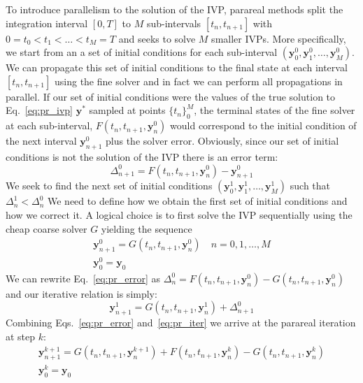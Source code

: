 \documentclass[11pt]{report}
\begin{document}
    To introduce parallelism to the solution of the IVP, parareal methods split the integration interval $[0, T]$ to $M$
    sub-intervals $[t_n, t_{n+1}]$ with $0 = t_0 < t_1 < \dots < t_M = T$ and seeks to solve $M$ smaller IVPs.
    More specifically, we start from an a set of initial conditions for each sub-interval
    $(\pmb{y}_0^{0}, \pmb{y}_1^{0}, \dots ,\pmb{y}_M^{0})$.
    We can propagate this set of initial conditions to the final state at each interval $[t_n, t_{n+1}]$ using the fine
    solver and in fact we can perform all propagations in parallel.
    If our set of initial conditions were the values of the true solution to Eq.~\ref{eq:pr_ivp} $\pmb{y}^*$ sampled at
    points $\{t_n\}_0^M$, the terminal states of the fine solver at each sub-interval, $F(t_n, t_{n+1}, \pmb{y}^0_n)$ would
    correspond to the initial condition of the next interval $\pmb{y}_{n+1}^0$ plus the solver error.
    Obviously, since our set of initial conditions is not the solution of the IVP there is an error term:
    \begin{equation}
        \label{eq:pr_error}
        \Delta^0_{n+1} = F(t_n, t_{n+1}, \pmb{y}^0_n) - \pmb{y}^0_{n+1}
    \end{equation}
    We seek to find the next set of initial conditions $(\pmb{y}_0^{1}, \pmb{y}_1^{1}, \dots ,\pmb{y}_M^{1})$ such that
    $\Delta_n^1 <  \Delta_n^0$
    We need to define how we obtain the first set of initial conditions and how we correct it.
    A logical choice is to first solve the IVP sequentially using the cheap coarse solver $G$ yielding the sequence
    \begin{gather}
        \label{eq:pr_init}
        \pmb{y}_{n+1}^0 = G(t_n, t_{n+1}, \pmb{y}_n^0) \quad n = 0,1, \dots, M \\
        \pmb{y}_0^0 = \pmb{y}_0
    \end{gather}
    We can rewrite Eq.~\eqref{eq:pr_error} as $\Delta_n^0 = F(t_n,t_{n+1}, \pmb{y}_n^0) - G(t_n, t_{n+1}, \pmb{y}_n^0)$
    and our iterative relation is simply:
    \begin{equation}
        \label{eq:pr_iter}
        \pmb{y}^1_{n+1} = G(t_n, t_{n+1}, \pmb{y}_n^{1}) + \Delta_{n+1}^0
    \end{equation}
    Combining Eqs.~\eqref{eq:pr_error} and~\eqref{eq:pr_iter} we arrive at the parareal iteration at step $k$:
    \begin{gather}
        \label{}
        \pmb{y}^{k+1}_{n+1} = G(t_n, t_{n+1}, \pmb{y}_n^{k+1}) + F(t_n, t_{n+1}, \pmb{y}_n^{k}) - G(t_n, t_{n+1}, \pmb{y}_n^{k}) \\
        \pmb{y}_0^k = \pmb{y}_0
    \end{gather}
\end{document}
